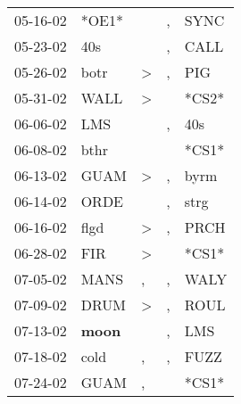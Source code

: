 \begin{supertabular}{p{0.07\textwidth}p{0.06\textwidth}p{0.02\textwidth}p{0.02\textwidth}p{0.06\textwidth}}
 05-16-02\textsuperscript{} &                            *OE1* &                  &             , &         SYNC\textsuperscript{} \\
 05-23-02\textsuperscript{} &            40s\textsuperscript{} &                  &             , &         CALL\textsuperscript{} \\
 05-26-02\textsuperscript{} &           botr\textsuperscript{} &     \textgreater &             , &          PIG\textsuperscript{} \\
 05-31-02\textsuperscript{} &           WALL\textsuperscript{} &     \textgreater &               &                          *CS2* \\
 06-06-02\textsuperscript{} &            LMS\textsuperscript{} &                  &             , &          40s\textsuperscript{} \\
 06-08-02\textsuperscript{} &           bthr\textsuperscript{} &                  &               &                          *CS1* \\
 06-13-02\textsuperscript{} &           GUAM\textsuperscript{} &     \textgreater &             , &         byrm\textsuperscript{} \\
 06-14-02\textsuperscript{} &           ORDE\textsuperscript{} &                  &             , &         strg\textsuperscript{} \\
 06-16-02\textsuperscript{} &           flgd\textsuperscript{} &     \textgreater &             , &         PRCH\textsuperscript{} \\
 06-28-02\textsuperscript{} &            FIR\textsuperscript{} &     \textgreater &               &                          *CS1* \\
 07-05-02\textsuperscript{} &           MANS\textsuperscript{} &                , &             , &         WALY\textsuperscript{} \\
 07-09-02\textsuperscript{} &           DRUM\textsuperscript{} &     \textgreater &             , &         ROUL\textsuperscript{} \\
 07-13-02\textsuperscript{} &  \textbf{moon\textsuperscript{}} &                  &             , &          LMS\textsuperscript{} \\
 07-18-02\textsuperscript{} &           cold\textsuperscript{} &                , &             , &         FUZZ\textsuperscript{} \\
 07-24-02\textsuperscript{} &           GUAM\textsuperscript{} &                , &               &                          *CS1* \\

\end{supertabular}
